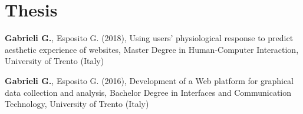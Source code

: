 \documentclass[a4paper]{deedy-resume} %
\begin{document}
\begin{minipage}[t]{0.63\textwidth}
	
	\sectionspace
	\section{Thesis}
	\sectionspace
	\begin{tightitemize}
	    \item \textbf{Gabrieli G.}, Esposito G. (2018), Using users' physiological response to predict aesthetic experience of websites, Master Degree in Human-Computer Interaction, University of Trento (Italy)
	    
	    \item \textbf{Gabrieli G.}, Esposito G. (2016), Development of a Web platform for graphical data collection and analysis, Bachelor Degree in Interfaces and Communication Technology, University of Trento (Italy)
	    
	\end{tightitemize}
	
\end{minipage} %
\end{document}
